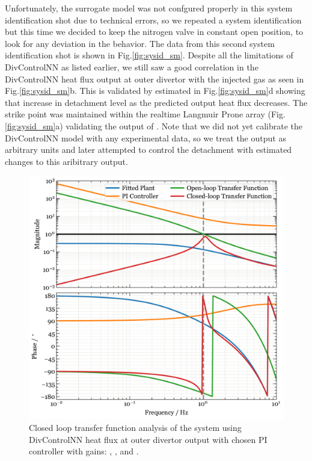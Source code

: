 

Unfortunately, the surrogate model was not confgured properly in this system identification shot due to technical errors, so we repeated a system identification but this time we decided to keep the nitrogen valve in constant open position, to look for any deviation in the behavior. The data from this second system identification shot is shown in Fig.\ref{fig:sysid_sm}. Despite all the limitations of DivControlNN as listed earlier, we still saw a good correlation in the DivControlNN heat flux output at outer divertor with the injected gas as seen in Fig.\ref{fig:sysid_sm}b. This is validated by estimated \Afrac in Fig.\ref{fig:sysid_sm}d showing that increase in detachment level as the predicted output heat flux decreases. The strike point was maintained within the realtime Langmuir Prone array (Fig.\ref{fig:sysid_sm}a) validating the output of \Afrac. Note that we did not yet calibrate the DivControlNN model with any experimental data, so we treat the output as arbitrary units and later attempted to control the detachment with estimated changes to this aribitrary output.



\begin{figure}[!ht]
 \centering
 \includegraphics[width=\linewidth]{figures/SM_LoopStability.pdf}
 \caption{Closed loop transfer function analysis of the system using DivControlNN heat flux at outer divertor output with chosen PI controller with gains: \SMKp, \SMTi, and \SMstau.}
 \label{fig:cltf_sm}
\end{figure}

